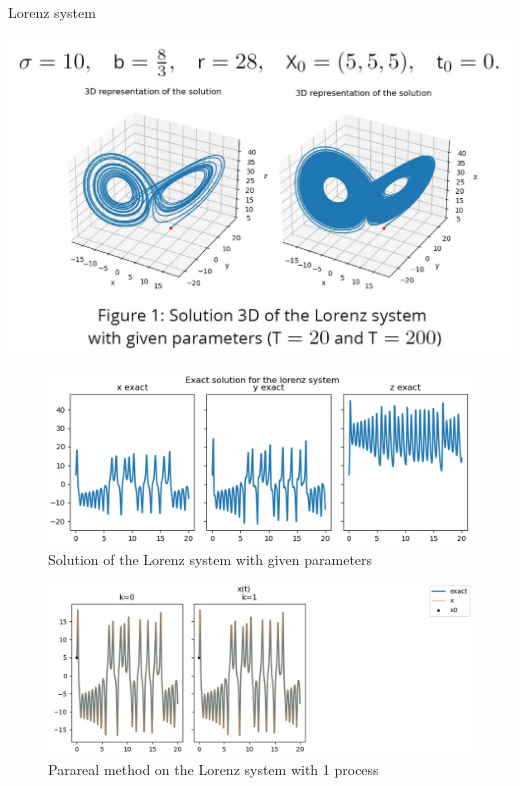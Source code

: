 \begin{frame}[allowframebreaks]{Lorenz system}
	\begin{minipage}{\linewidth}
		\centering
		\includegraphics[width=0.8\linewidth]{"images/parareal/lorenz_sol3D.jpg"}
	\end{minipage}

	\newpage

	\begin{minipage}{\linewidth}
	\begin{figure} 
		\centering     
		\includegraphics[width=\linewidth]{"images/parareal/lorenz_exact.jpg"}
		\caption{Solution of the Lorenz system with given parameters}
	\end{figure}
	\end{minipage}

	\newpage
	
	\begin{minipage}{\linewidth}
	\begin{figure}
		\centering       
		\includegraphics[width=0.9\linewidth]{"images/parareal/lorenz_1p.jpg"}
		\caption{Parareal method on the Lorenz system with 1 process}
	\end{figure}
	\end{minipage}


\end{frame}
